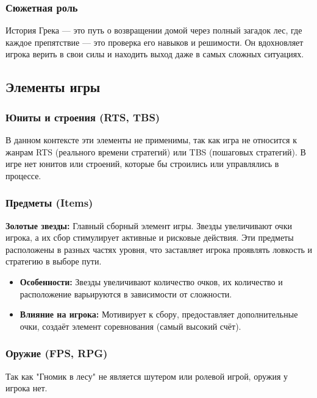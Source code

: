 \documentclass{article}
\begin{document}
\subsubsection{Сюжетная роль} 
История Грека — это путь о возвращении домой через полный загадок лес, где каждое препятствие — это проверка его навыков и решимости. Он вдохновляет игрока верить в свои силы и находить выход даже в самых сложных ситуациях.



\subsection{Элементы игры}

\subsubsection{Юниты и строения (RTS, TBS)}
В данном контексте эти элементы не применимы, так как игра не относится к жанрам RTS (реального времени стратегий) или TBS (пошаговых стратегий). В игре нет юнитов или строений, которые бы строились или управлялись в процессе.

\subsubsection{Предметы (Items)}
\textbf{Золотые звезды:} Главный сборный элемент игры. Звезды увеличивают очки игрока, а их сбор стимулирует активные и рисковые действия. Эти предметы расположены в разных частях уровня, что заставляет игрока проявлять ловкость и стратегию в выборе пути.
\begin{itemize}
    \item \textbf{Особенности:} Звезды увеличивают количество очков, их количество и расположение варьируются в зависимости от сложности.
    \item \textbf{Влияние на игрока:} Мотивирует к сбору, предоставляет дополнительные очки, создаёт элемент соревнования (самый высокий счёт).
\end{itemize}

\subsubsection{Оружие (FPS, RPG)}
Так как "Гномик в лесу" не является шутером или ролевой игрой, оружия у игрока нет.
\end{document}
